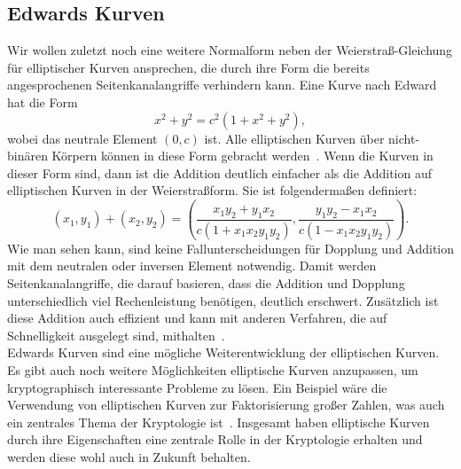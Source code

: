 \documentclass[hidelinks]{article}
\theoremstyle{plain}
\theoremstyle{definition}
\theoremstyle{rem}
\begin{document}
\begin{sloppypar}
\subsection{Edwards Kurven}
Wir wollen zuletzt noch eine weitere Normalform neben der Weierstraß-Gleichung für elliptischer Kurven ansprechen, die durch ihre Form die bereits angesprochenen Seitenkanalangriffe verhindern kann.
Eine Kurve nach Edward hat die Form\\
\begin{equation*}
	x^2 + y^2 = c^2(1+x^2+y^2),
\end{equation*} 
wobei das neutrale Element $(0,c)$ ist. 
Alle elliptischen Kurven über nicht-binären Körpern können in diese Form gebracht werden~\cite{bernstein2007}. 
Wenn die Kurven in dieser Form sind, dann ist die Addition deutlich einfacher als die Addition auf elliptischen Kurven in der Weierstraßform.
Sie ist folgendermaßen definiert:
\begin{equation*}
    (x_1, y_1) + (x_2, y_2) = \left( \frac{x_1y_2 + y_1x_2}{c(1+x_1x_2y_1y_2)} , \frac{y_1y_2 - x_1x_2}{c(1-x_1x_2y_1y_2)} \right).
\end{equation*}
Wie man sehen kann, sind keine Fallunterscheidungen für Dopplung und Addition mit dem neutralen oder inversen Element notwendig. 
Damit werden Seitenkanalangriffe, die darauf basieren, dass die Addition und Dopplung unterschiedlich viel Rechenleistung benötigen, deutlich erschwert. 
Zusätzlich ist diese Addition auch effizient und kann mit anderen Verfahren, die auf Schnelligkeit ausgelegt sind, mithalten~\cite{bernstein2007}. \\
\newline
Edwards Kurven sind eine mögliche Weiterentwicklung der elliptischen Kurven. Es gibt auch noch weitere Möglichkeiten elliptische Kurven anzupassen, um kryptographisch interessante Probleme zu lösen. Ein Beispiel wäre die Verwendung von elliptischen Kurven zur Faktorisierung großer Zahlen, was auch ein zentrales Thema der Kryptologie ist~\cite{lenstra1987}.
Insgesamt haben elliptische Kurven durch ihre Eigenschaften eine zentrale Rolle in der Kryptologie erhalten und werden diese wohl auch in Zukunft behalten.
\end{sloppypar}
\newpage


\end{document}
